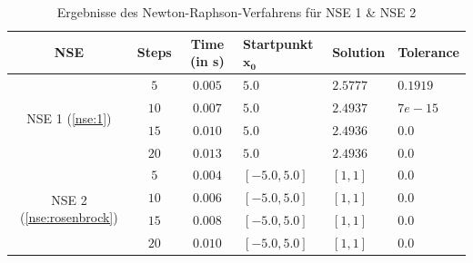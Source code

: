 \documentclass{article}
\theoremstyle{newline}
\begin{document}
\begin{onehalfspace}
\begin{table}[h]
	\centering
	
	\begin{tabular}{c||c|c|>{\centering\arraybackslash}p{2cm}|>{\centering\arraybackslash}p{3cm}|>{\centering\arraybackslash}p{2.5cm}}
		\textbf{NSE} & \textbf{Steps} & \textbf{Time} (in s) & \textbf{Startpunkt} $\mathbf{x_0}$ & \textbf{Solution} & \textbf{Tolerance}  \\
		\hline
		\multirow{4}{*}{NSE 1 (\ref{nse:1})} & $5$ & $0.005$ & $5.0$ & $2.5777$ & $0.1919$\\
		& $10$ & $0.007$ & $5.0$ & $2.4937$ & $7e-15$\\
		& $15$ & $0.010$ & $5.0$ & $2.4936$ & $0.0$\\
		& $20$ & $0.013$ & $5.0$ & $2.4936$ & $0.0$\\
		\hline
		\multirow{4}{*}{NSE 2 (\ref{nse:rosenbrock})} & $5$ & $0.004$ & $[-5.0, 5.0]$ & $[1, 1]$ & $0.0$\\
		 & $10$ & $0.006$ & $[-5.0, 5.0]$ & $[1, 1]$ & $0.0$\\
		 & $15$ & $0.008$ & $[-5.0, 5.0]$ & $[1, 1]$ & $0.0$\\
		 & $20$ & $0.010$ & $[-5.0, 5.0]$ & $[1, 1]$ & $0.0$\\
	\end{tabular}
	\caption{Ergebnisse des Newton-Raphson-Verfahrens für NSE 1 \& NSE 2}
	\label{tab:Ergebnisse-Newton}
\end{table}


\end{onehalfspace}
\end{document}
